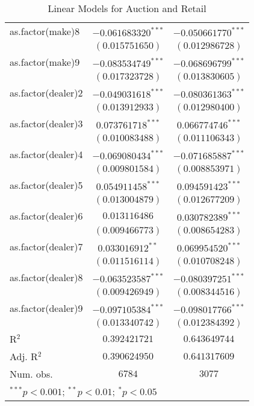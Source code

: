 \begin{table}
\begin{center}
\begin{small}
\begin{tabular}{l c c}
as.factor(make)8   & $-0.061683320^{***}$ & $-0.050661770^{***}$ \\
                   & $(0.015751650)$      & $(0.012986728)$      \\
as.factor(make)9   & $-0.083534749^{***}$ & $-0.068696799^{***}$ \\
                   & $(0.017323728)$      & $(0.013830605)$      \\
as.factor(dealer)2 & $-0.049031618^{***}$ & $-0.080361363^{***}$ \\
                   & $(0.013912933)$      & $(0.012980400)$      \\
as.factor(dealer)3 & $0.073761718^{***}$  & $0.066774746^{***}$  \\
                   & $(0.010083488)$      & $(0.011106343)$      \\
as.factor(dealer)4 & $-0.069080434^{***}$ & $-0.071685887^{***}$ \\
                   & $(0.009801584)$      & $(0.008853971)$      \\
as.factor(dealer)5 & $0.054911458^{***}$  & $0.094591423^{***}$  \\
                   & $(0.013004879)$      & $(0.012677209)$      \\
as.factor(dealer)6 & $0.013116486$        & $0.030782389^{***}$  \\
                   & $(0.009466773)$      & $(0.008654283)$      \\
as.factor(dealer)7 & $0.033016912^{**}$   & $0.069954520^{***}$  \\
                   & $(0.011516114)$      & $(0.010708248)$      \\
as.factor(dealer)8 & $-0.063523587^{***}$ & $-0.080397251^{***}$ \\
                   & $(0.009426949)$      & $(0.008344516)$      \\
as.factor(dealer)9 & $-0.097105384^{***}$ & $-0.098017766^{***}$ \\
                   & $(0.013340742)$      & $(0.012384392)$      \\
\hline
R$^2$              & $0.392421721$        & $0.643649744$        \\
Adj. R$^2$         & $0.390624950$        & $0.641317609$        \\
Num. obs.          & $6784$               & $3077$               \\
\hline
\multicolumn{3}{l}{\tiny{$^{***}p<0.001$; $^{**}p<0.01$; $^{*}p<0.05$}}
\end{tabular}
\end{small}
\caption{Linear Models for Auction and Retail}
\label{tab:lm_rec_auc}
\end{center}
\end{table}
